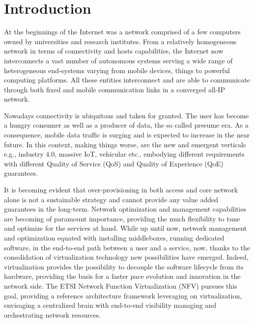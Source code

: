 \chapter{Introduction}
\label{chap:intro}
At the beginnings of the Internet was a network comprised of a few computers
owned by universities and research institutes. From a relatively homogeneous
network in terms of connectivity and hosts capabilities, the Internet now
interconnects a vast number of autonomous systems serving a wide range of
heterogeneous end-systems varying from mobile devices, things to powerful
computing platforms. All these entities interconnect and are able to
communicate through both fixed and mobile communication links in a converged
all-IP network. 

Nowadays connectivity is ubiquitous and taken for granted. The user has become
a hungry consumer as well as a producer of data, the so called presume era. As a
consequence, mobile data traffic is surging and is expected to increase in the
near future. In this context, making things worse, are the new and emergent
verticals e.g., industry 4.0, massive IoT, vehicular etc., embodying different
requirements with different Quality of Service (QoS) and Quality of Experience 
(QoE) guarantees. 

It is becoming evident that over-provisioning in both access and core network
alone is not a sustainable strategy and cannot provide any value added
guarantees in the long-term. Network optimization and management capabilities
are becoming of paramount importance, providing the much flexibility to tune
and optimize for the services at hand. While up until now, network management
and optimization equated with installing middleboxes, running dedicated
software, in the end-to-end path between a user and a service, now, thanks to
the consolidation of virtualization technology new possibilities have emerged.
Indeed, virtualization provides the possibility to decouple the software
lifecycle from its hardware, providing the basis for a faster pace evolution
and innovation in the network side. The ETSI Network Function Virtualization 
(NFV) pursues this goal, providing a reference architecture framework leveraging
on virtualization, envisaging a centralized brain with end-to-end visibility
managing and orchestrating network resources.

